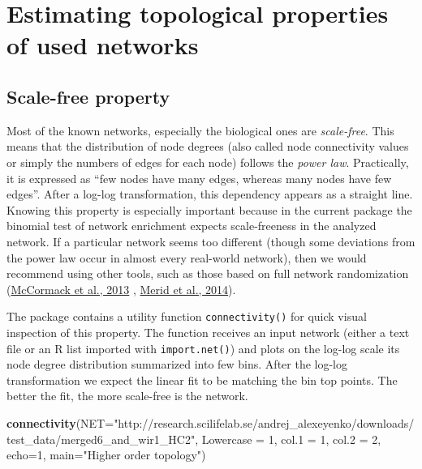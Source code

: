 \documentclass[]{article}
\newenvironment{Shaded}{\begin{snugshade}}{\end{snugshade}}
\newcommand{\KeywordTok}[1]{\textcolor[rgb]{0.13,0.29,0.53}{\textbf{#1}}}
\newcommand{\DataTypeTok}[1]{\textcolor[rgb]{0.13,0.29,0.53}{#1}}
\newcommand{\DecValTok}[1]{\textcolor[rgb]{0.00,0.00,0.81}{#1}}
\newcommand{\StringTok}[1]{\textcolor[rgb]{0.31,0.60,0.02}{#1}}
\newcommand{\NormalTok}[1]{#1}
\begin{document}
\hypertarget{connect}{\section{Estimating topological properties of used
networks}\label{connect}}

\hypertarget{sfp}{\subsection{Scale-free property}\label{sfp}}

Most of the known networks, especially the biological ones are
\emph{scale-free}. This means that the distribution of node degrees
(also called node connectivity values or simply the numbers of edges for
each node) follows the \emph{power law}. Practically, it is expressed as
``few nodes have many edges, whereas many nodes have few edges''. After
a log-log transformation, this dependency appears as a straight line.
Knowing this property is especially important because in the current
package the binomial test of network enrichment expects scale-freeness
in the analyzed network. If a particular network seems too different
(though some deviations from the power law occur in almost every
real-world network), then we would recommend using other tools, such as
those based on full network randomization
(\href{http://www.ncbi.nlm.nih.gov/pubmed/23372799}{McCormack et al.,
2013} , \href{http://www.ncbi.nlm.nih.gov/pubmed/25236784}{Merid et al.,
2014}).

The package contains a utility function \texttt{connectivity()} for
quick visual inspection of this property. The function receives an input
network (either a text file or an R list imported with
\texttt{import.net()}) and plots on the log-log scale its node degree
distribution summarized into few bins. After the log-log transformation
we expect the linear fit to be matching the bin top points. The better
the fit, the more scale-free is the network.

\begin{Shaded}
\begin{Highlighting}[]
\KeywordTok{connectivity}\NormalTok{(}\DataTypeTok{NET=}\StringTok{"http://research.scilifelab.se/andrej_alexeyenko/downloads/test_data/merged6_and_wir1_HC2"}\NormalTok{, }\DataTypeTok{Lowercase =} \DecValTok{1}\NormalTok{, }\DataTypeTok{col.1 =} \DecValTok{1}\NormalTok{, }\DataTypeTok{col.2 =} \DecValTok{2}\NormalTok{, }\DataTypeTok{echo=}\DecValTok{1}\NormalTok{, }\DataTypeTok{main=}\StringTok{"Higher order topology"}\NormalTok{)}
\end{Highlighting}
\end{Shaded}
\end{document}
